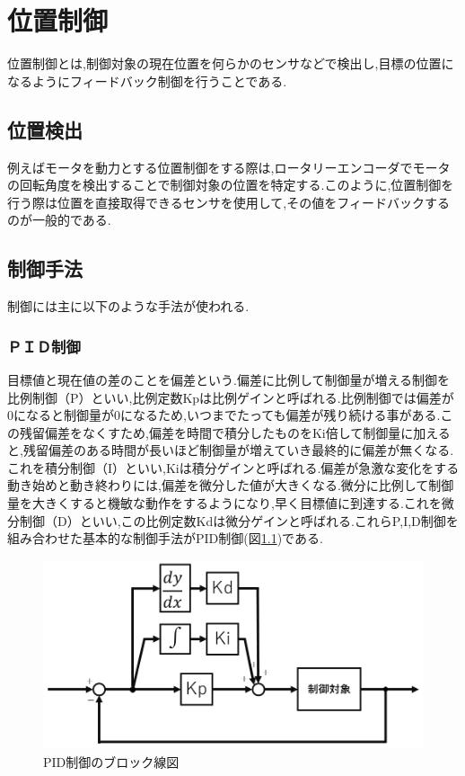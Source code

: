 
\chapter{位置制御}位置制御とは,制御対象の現在位置を何らかのセンサなどで検出し,目標の位置になるようにフィードバック制御を行うことである.

\section{位置検出}例えばモータを動力とする位置制御をする際は,ロータリーエンコーダでモータの回転角度を検出することで制御対象の位置を特定する.このように,位置制御を行う際は位置を直接取得できるセンサを使用して,その値をフィードバックするのが一般的である.

\section{制御手法}
制御には主に以下のような手法が使われる.

\subsection{ＰＩＤ制御}目標値と現在値の差のことを偏差という.偏差に比例して制御量が増える制御を比例制御（P）といい,比例定数Kpは比例ゲインと呼ばれる.比例制御では偏差が0になると制御量が0になるため,いつまでたっても偏差が残り続ける事がある.この残留偏差をなくすため,偏差を時間で積分したものをKi倍して制御量に加えると,残留偏差のある時間が長いほど制御量が増えていき最終的に偏差が無くなる.これを積分制御（I）といい,Kiは積分ゲインと呼ばれる.偏差が急激な変化をする動き始めと動き終わりには,偏差を微分した値が大きくなる.微分に比例して制御量を大きくすると機敏な動作をするようになり,早く目標値に到達する.これを微分制御（D）といい,この比例定数Kdは微分ゲインと呼ばれる.これらP,I,D制御を組み合わせた基本的な制御手法がPID制御(図\ref{fig:PID})である.

\begin{figure}[htbp]
  \begin{center}
    \includegraphics[width=120mm]{img/PID.png}
    \end{center}
  \caption{PID制御のブロック線図}
 \label{fig:PID}
\end{figure}

